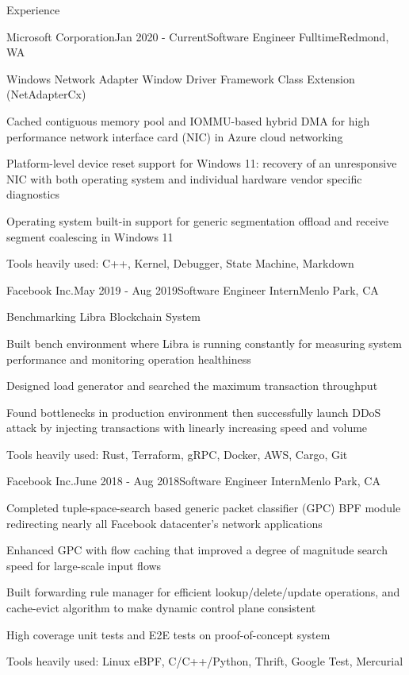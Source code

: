 \documentclass{resume} %
\begin{document}
\begin{rSection}{Experience}

\begin{rSubsection}{Microsoft Corporation}{Jan 2020 - Current}{Software Engineer Fulltime}{Redmond, WA}
\item Windows Network Adapter Window Driver Framework Class Extension (NetAdapterCx)
\item Cached contiguous memory pool and IOMMU-based hybrid DMA for high performance network interface card (NIC) in Azure cloud networking
\item Platform-level device reset support for Windows 11: recovery of an unresponsive NIC with both operating system and individual hardware vendor specific diagnostics
\item Operating system built-in support for generic segmentation offload and receive segment coalescing in Windows 11
\item Tools heavily used: C++, Kernel, Debugger, State Machine, Markdown
\end{rSubsection}

\begin{rSubsection}{Facebook Inc.}{May 2019 - Aug 2019}{Software Engineer Intern}{Menlo Park, CA}
\item Benchmarking Libra Blockchain System 
\item Built bench environment where Libra is running constantly for measuring system performance and monitoring operation healthiness
\item Designed load generator and searched the maximum transaction throughput
\item Found bottlenecks in production environment then successfully launch DDoS attack by injecting transactions with linearly increasing speed and volume
\item Tools heavily used: Rust, Terraform, gRPC, Docker, AWS, Cargo, Git
\end{rSubsection}

\begin{rSubsection}{Facebook Inc.}{June 2018 - Aug 2018}{Software Engineer Intern}{Menlo Park, CA}
\item Completed tuple-space-search based generic packet classifier (GPC) BPF module redirecting nearly all Facebook datacenter’s network applications
\item Enhanced GPC with flow caching that improved a degree of magnitude search speed for large-scale input flows
\item Built forwarding rule manager for efficient lookup/delete/update operations, and cache-evict algorithm to make dynamic control plane consistent
\item High coverage unit tests and E2E tests on proof-of-concept system
\item Tools heavily used: Linux eBPF, C/C++/Python, Thrift, Google Test, Mercurial
\end{rSubsection}


\end{rSection}
\end{document}
